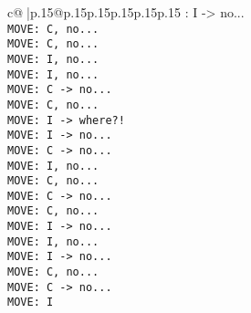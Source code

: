 \documentclass{article}
\begin{document}
{\begin{supertabular}{c@{$\;$}|p{.15\linewidth}@{}p{.15\linewidth}p{.15\linewidth}p{.15\linewidth}p{.15\linewidth}p{.15\linewidth}}
{{{: I -> no...\\ \tt  MOVE: C, no...\\ \tt  MOVE: C, no...\\ \tt  MOVE: I, no...\\ \tt  MOVE: I, no...\\ \tt  MOVE: C -> no...\\ \tt  MOVE: C, no...\\ \tt  MOVE: I -> where?!\\ \tt  MOVE: I -> no...\\ \tt  MOVE: C -> no...\\ \tt  MOVE: I, no...\\ \tt  MOVE: C, no...\\ \tt  MOVE: C -> no...\\ \tt  MOVE: C, no...\\ \tt  MOVE: I -> no...\\ \tt  MOVE: I, no...\\ \tt  MOVE: I -> no...\\ \tt  MOVE: C, no...\\ \tt  MOVE: C -> no...\\ \tt  MOVE: I}}}
\end{supertabular}}
\end{document}

